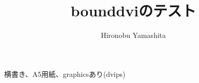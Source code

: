 \documentclass[a5paper,tombow]{jarticle}
\title{\textsf{bounddvi}のテスト}
\author{Hironobu Yamashita}
\begin{document}
横書き、A5用紙、graphicsあり(dvips)
\end{document}
